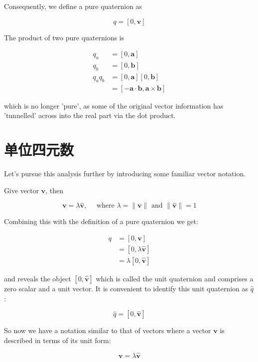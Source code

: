 Consequently, we define a pure quaternion as

$$
    q=[0, \mathbf{v}]
$$

The product of two pure quaternions is

$$
    \begin{aligned}
        q_{a}       & =[0, \mathbf{a}]                                              \\
        q_{b}       & =[0, \mathbf{b}]                                              \\
        q_{a} q_{b} & =[0, \mathbf{a}][0, \mathbf{b}]                               \\
                    & =[-\mathbf{a} \cdot \mathbf{b}, \mathbf{a} \times \mathbf{b}]
    \end{aligned}
$$

which is no longer 'pure', as some of the original vector information has 'tunnelled' across into the real part via the dot product.

\section{单位四元数}
Let's pursue this analysis further by introducing some familiar vector notation.

Give vector $\mathbf{v}$, then

$$
    \mathbf{v}=\lambda \hat{\mathbf{v}}, \quad \text { where } \lambda=\|\mathbf{v}\| \text { and }\|\hat{\mathbf{v}}\|=1
$$

Combining this with the definition of a pure quaternion we get:

$$
    \begin{aligned}
        q & =[0, \mathbf{v}]               \\
          & =[0, \lambda \hat{\mathbf{v}}] \\
          & =\lambda[0, \hat{\mathbf{v}}]
    \end{aligned}
$$

and reveals the object $[0, \hat{\mathbf{v}}]$ which is called the unit quaternion and comprises a zero scalar and a unit vector. It is convenient to identify this unit quaternion as $\hat{q}$ :

$$
    \hat{q}=[0, \hat{\mathbf{v}}]
$$

So now we have a notation similar to that of vectors where a vector $\mathbf{v}$ is described in terms of its unit form:

$$
    \mathbf{v}=\lambda \hat{\mathbf{v}}
$$


